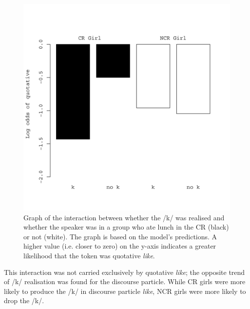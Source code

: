 \begin{figure}[t]
	\centering
		\includegraphics[height=.4\textheight]{images/kCR.jpg}
	\caption{Graph of the interaction between whether the /k/ was realised and whether the speaker was in a group who ate lunch in the CR (black) or not (white). The graph is based on the model's predictions. A higher value (i.e. closer to zero) on the y-axis indicates a greater likelihood that the token was quotative \textit{like}.}
	\label{fig:kCR-qdp}
\end{figure}







This interaction was not carried exclusively by quotative \textit{like}; the opposite trend of /k/ realisation was found for the discourse particle. While CR girls were more likely to produce the /k/ in discourse particle \textit{like}, NCR girls were more likely to drop the /k/.

